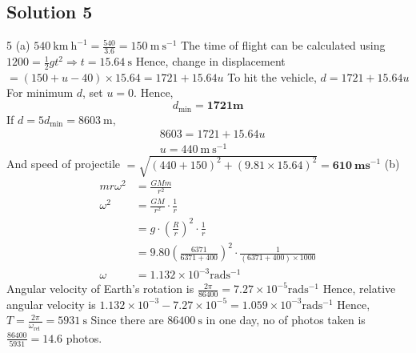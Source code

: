 \documentclass{article}
\begin{document}
\subsection{Solution 5}
5 (a) $540 \mathrm{~km} \mathrm{~h}^{-1}=\frac{540}{3.6}=150 \mathrm{~m} \mathrm{~s}^{-1}$
The time of flight can be calculated using $1200=\frac{1}{2} g t^{2} \Rightarrow t=15.64 \mathrm{~s}$
Hence, change in displacement $=(150+u-40) \times 15.64=1721+15.64 u$
To hit the vehicle, $d=1721+15.64 u$
For minimum $d$, set $u=0$. Hence,
$$
d_{\min }=\mathbf{1 7 2 1} \mathbf{m}
$$
If $d=5 d_{\min }=8603 \mathrm{~m}$,
$$
\begin{aligned}
	&8603=1721+15.64 u \\
	&u=440 \mathrm{~m} \mathrm{~s}^{-1}
\end{aligned}
$$
And speed of projectile $=\sqrt{(440+150)^{2}+(9.81 \times 15.64)^{2}}=\mathbf{6 1 0} \mathbf{~ m} \mathbf{s}^{-1}$
(b)
$$
\begin{aligned}
	m r \omega^{2} &=\frac{G M m}{r^{2}} \\
	\omega^{2} &=\frac{G M}{r^{2}} \cdot \frac{1}{r} \\
	&=g \cdot\left(\frac{R}{r}\right)^{2} \cdot \frac{1}{r} \\
	&=9.80\left(\frac{6371}{6371+400}\right)^{2} \cdot \frac{1}{(6371+400) \times 1000} \\
	\omega &=1.132 \times 10^{-3} \mathrm{rad} \mathrm{s}^{-1}
\end{aligned}
$$
Angular velocity of Earth's rotation is $\frac{2 \pi}{86400}=7.27 \times 10^{-5} \mathrm{rad} \mathrm{s}^{-1}$
Hence, relative angular velocity is $1.132 \times 10^{-3}-7.27 \times 10^{-5}=1.059 \times 10^{-3} \mathrm{rad} \mathrm{s}^{-1}$
Hence, $T=\frac{2 \pi}{\omega_{\text {rel }}}=5931 \mathrm{~s}$
Since there are $86400 \mathrm{~s}$ in one day, no of photos taken is $\frac{86400}{5931}=14.6$ photos. 
\end{document}
